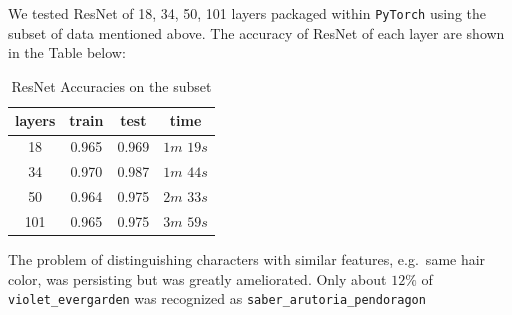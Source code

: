 \documentclass[11.5pt]{article}
\begin{document}
\begin{enumerate}
\begin{itemize}
            We tested ResNet of 18, 34, 50, 101 layers packaged within \texttt{PyTorch} using the subset of data mentioned above.
            The accuracy of ResNet of each layer are shown in the Table below:
            \begin{table}[h!]
                \centering
                \caption{ResNet Accuracies on the subset}
                    \begin{tabular}{|c|c|c|c|}
                        \hline
                        layers & train & test & time \\ \hline
                        18 & 0.965 & 0.969 & $1m$ $19s$ \\ \hline
                        34  & 0.970 & 0.987 & $1m$ $44s$ \\ \hline
                        50 & 0.964 & 0.975 & $2m$ $33s$ \\ \hline
                        101 & 0.965 & 0.975 & $3m$ $59s$ \\ \hline
                    \end{tabular}
            \end{table}

            The problem of distinguishing characters with similar features, e.g.\ same hair color, was persisting but was greatly ameliorated.
            Only about $12\%$ of \texttt{violet\_evergarden} was recognized as \texttt{saber\_arutoria\_pendoragon}
        \end{itemize}
    \end{enumerate}
\end{document}
